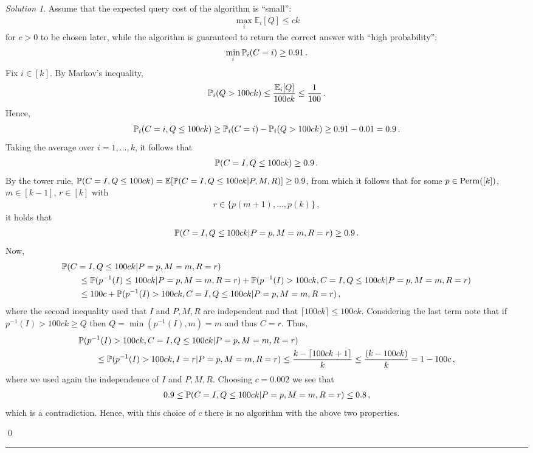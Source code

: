 \documentclass{article}
\DeclareMathOperator*{\1}{\mathbbm{1}}
\newcommand{\E}{\mathbb E}
\newcommand{\EE}[1]{\E[#1]}
\newcommand{\0}{\mathbf{0}}
\theoremstyle{definition}
\theoremstyle{remark}
\newtheorem*{solution*}{Solution}
\theoremstyle{theorem}
\begin{document}
\begin{solution*}
Assume that the expected query cost of the algorithm is ``small'':
\begin{align*}
\max_i \E_i[Q] \le c k
\end{align*}
for $c>0$ to be chosen later,
while the algorithm is guaranteed to return the correct answer with ``high probability'':
\begin{align*}
\min_i \mathbb{P}_i(C=i)\ge 0.91\,.
\end{align*}
Fix $i\in [k]$. By Markov's inequality,
\begin{align*}
\PP_i(Q>100ck)\le \frac{\E_i[Q]}{100ck} \le \frac{1}{100}\,.
\end{align*}
Hence,
\begin{align*}
\mathbb{P}_i(C=i,Q\le 100ck) \ge \mathbb{P}_i(C=i)-\mathbb{P}_i(Q>100ck)\ge 0.91-0.01=0.9\,.
\end{align*}
Taking the average over $i=1,\dots,k$, it follows that
\begin{align*}
\mathbb{P}(C=I,Q\le 100ck) \ge 0.9\,.
\end{align*}
By the tower rule,
$\PP(C=I,Q\le 100ck) = \EE{ \PP(C=I,Q\le 100ck | P,M,R) } \ge 0.9$,
from which it follows that for some $p\in \mathrm{Perm}([k])$, $m\in [k-1]$, $r\in [k]$
with
\begin{align*}
r\in \{ p(m+1),\dots,p(k)\}\,,
\end{align*}
it holds that
\begin{align*}
\mathbb{P}(C=I,Q\le 100ck | P=p,M=m,R=r) \ge 0.9\,.
\end{align*}
Now,
\begin{align*}
\MoveEqLeft
\PP(C=I,Q\le 100ck | P=p,M=m,R=r)
 \\
& \le \PP( p^{-1}(I)\le 100ck | P=p,M=m,R=r)
+
\PP( p^{-1}(I)> 100ck,C=I,Q\le 100ck  | P=p,M=m,R=r)\\
&\le 100 c +
\PP( p^{-1}(I)> 100ck,C=I,Q\le 100ck  | P=p,M=m,R=r)\,,
\end{align*}
where the second inequality used that $I$ and $P,M,R$ are independent and that $\lceil 100ck \rceil \le 100ck$.
Considering the last term note that if $p^{-1}(I)>100ck\ge Q$ then $Q=\min(p^{-1}(I),m)=m$
and thus $C=r$.
Thus,
\begin{align*}
\MoveEqLeft
\PP( p^{-1}(I)> 100ck,C=I,Q\le 100ck  | P=p,M=m,R=r)\\
& \le
\PP( p^{-1}(I)> 100ck,I=r   | P=p,M=m,R=r)
\le
\frac{k-\lceil 100ck+1 \rceil}{k}
\le
\frac{(k- 100ck)}{k}
= 1-100c\,,
\end{align*}
where we used again the independence of $I$ and $P,M,R$.
Choosing $c=0.002$ we see that
\begin{align*}
0.9\le
\mathbb{P}(C=I,Q\le 100ck | P=p,M=m,R=r)
\le 0.8\,,
\end{align*}
which is a contradiction.
Hence, with this choice of $c$ there is no algorithm with the above two properties.

\qed\par\smallskip\hrule
\end{solution*}
\end{document}
